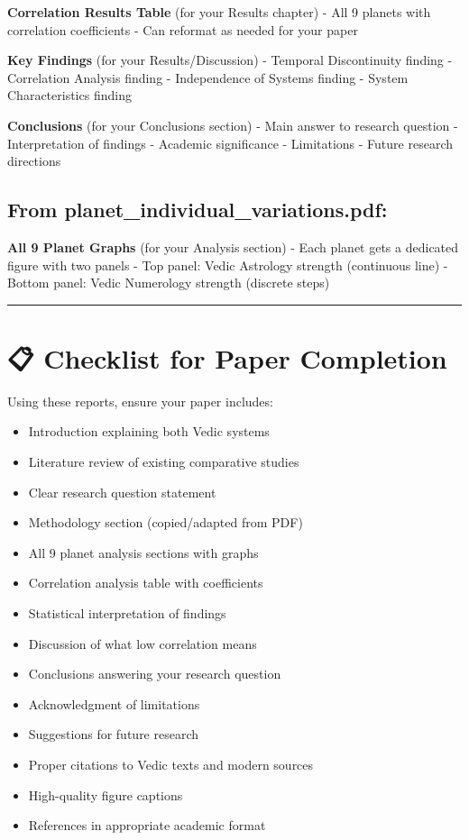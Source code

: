 \documentclass[
  11pt,
  oneside,
  openany]{scrbook}
\providecommand{\tightlist}{%
  \setlength{\itemsep}{0pt}\setlength{\parskip}{0pt}}\usepackage{longtable,booktabs,array}
\begin{document}
\textbf{Correlation Results Table} (for your Results chapter) - All 9
planets with correlation coefficients - Can reformat as needed for your
paper

\textbf{Key Findings} (for your Results/Discussion) - Temporal
Discontinuity finding - Correlation Analysis finding - Independence of
Systems finding - System Characteristics finding

\textbf{Conclusions} (for your Conclusions section) - Main answer to
research question - Interpretation of findings - Academic significance -
Limitations - Future research directions

\subsection{From
planet\_individual\_variations.pdf:}\label{from-planet_individual_variations.pdf}

\textbf{All 9 Planet Graphs} (for your Analysis section) - Each planet
gets a dedicated figure with two panels - Top panel: Vedic Astrology
strength (continuous line) - Bottom panel: Vedic Numerology strength
(discrete steps)

\begin{center}\rule{0.5\linewidth}{0.5pt}\end{center}

\section{📋 Checklist for Paper
Completion}\label{checklist-for-paper-completion}

Using these reports, ensure your paper includes:

\begin{itemize}
\tightlist
\item[$\square$]
  Introduction explaining both Vedic systems
\item[$\square$]
  Literature review of existing comparative studies\\
\item[$\square$]
  Clear research question statement
\item[$\square$]
  Methodology section (copied/adapted from PDF)
\item[$\square$]
  All 9 planet analysis sections with graphs
\item[$\square$]
  Correlation analysis table with coefficients
\item[$\square$]
  Statistical interpretation of findings
\item[$\square$]
  Discussion of what low correlation means
\item[$\square$]
  Conclusions answering your research question
\item[$\square$]
  Acknowledgment of limitations
\item[$\square$]
  Suggestions for future research
\item[$\square$]
  Proper citations to Vedic texts and modern sources
\item[$\square$]
  High-quality figure captions
\item[$\square$]
  References in appropriate academic format
\end{itemize}
\end{document}
